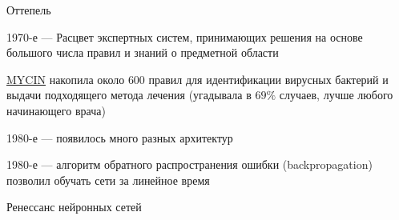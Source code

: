 \documentclass[notes,12pt, aspectratio=169]{beamer}
\newenvironment{wideitemize}{\itemize\addtolength{\itemsep}{10pt}}{\enditemize}
\begin{document}
\begin{frame}{Оттепель}
	\begin{wideitemize}
		\item 1970-е — Расцвет экспертных систем, принимающих решения на основе большого числа правил и знаний о предметной области

		\item {\color{blue} \href{https://en.wikipedia.org/wiki/Mycin}{MYCIN}} накопила около $600$ правил для идентификации вирусных бактерий и выдачи подходящего метода лечения (угадывала в $69\%$ случаев, лучше любого начинающего врача)

		\item 1980-е  — появилось много разных архитектур

		\item 1980-е — алгоритм обратного распространения ошибки (backpropagation) позволил обучать сети за линейное время

		\item Ренессанс нейронных сетей
	\end{wideitemize}
\end{frame}
\end{document}
